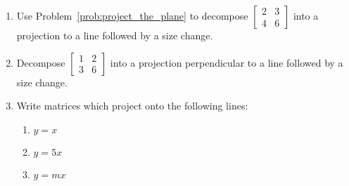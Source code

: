 \documentclass[../gatm.tex]{subfiles}
\begin{document}
\begin{enumerate}
\item Use Problem~\ref{prob:project_the_plane} to decompose $\left[\begin{smallmatrix} 2 & 3 \\ 4 & 6 \end{smallmatrix}\right]$ into a projection to a line followed by a size change.
\item Decompose $\left[\begin{smallmatrix} 1 & 2 \\ 3 & 6\end{smallmatrix}\right]$ into a projection perpendicular to a line followed by a size change.
\item Write matrices which project onto the following lines:
\begin{enumerate}
\item $y=x$
\item $y=5x$
\item $y=mx$
\end{enumerate}
\vspace{-10ex}
\end{enumerate}
\end{document}
